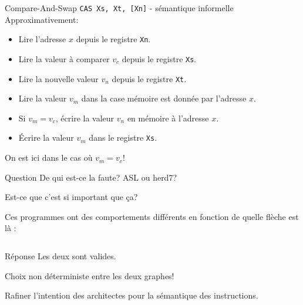 \documentclass[10pt, dvipsnames]{beamer}
\begin{document}
\begin{frame}{Compare-And-Swap \texttt{CAS Xs, Xt, [Xn]} - s\'emantique informelle}
  Approximativement:
  \begin{itemize}%
      \color{gray}
    \item Lire l'adresse $x$ depuis le registre \texttt{Xn}.
    \item Lire la valeur \`a comparer $v_c$ depuis le registre \texttt{Xs}.
    \item Lire la nouvelle valeur $v_n$ depuis le registre \texttt{Xt}.
    \item Lire la valeur $v_m$ dans la case m\'emoire est donn\'ee par l'adresse $x$.
      \color{black}
    \item Si $v_m = v_c$, \'ecrire la valeur $v_n$ en m\'emoire \`a l'adresse $x$.
    \item \'Ecrire la valeur $v_m$ dans le registre \texttt{Xs}.
  \end{itemize}
  \vfill
  On est ici dans le cas o\`u $v_m = v_c$!
\end{frame}

\begin{frame}[fragile]{Question}
  De qui est-ce la faute? ASL ou herd7?

  \vfill
  Est-ce que c'est si important que ça?

  \pause
  \vfill
  Ces programmes ont des comportements diff\'erents en fonction de quelle fl\`eche est l\`a :

  \begin{columns}[T]
    \hfill
    \begin{column}{.4\textwidth}
      
    \end{column}
    \hfill
    \begin{column}{.4\textwidth}
      
    \end{column}
    \hfill
  \end{columns}
\end{frame}

\begin{frame}{R\'eponse}
  Les deux sont valides.

  \vspace{1em}
  Choix non d\'eterministe entre les deux graphes!

  \vspace{1em}
  Rafiner l'intention des architectes pour la s\'emantique des instructions.
\end{frame}
\end{document}
